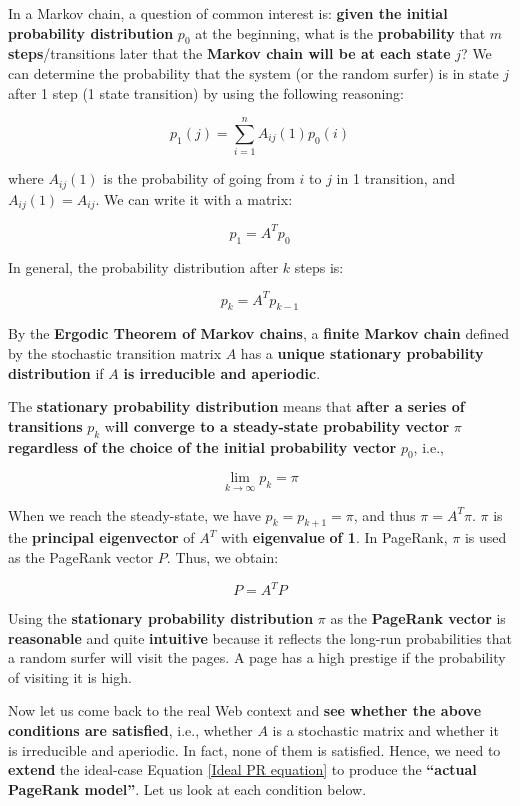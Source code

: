 In a Markov chain, a question of common interest is: \textbf{given the initial probability distribution} $p_0$ at the beginning, what is the \textbf{probability} that $m$ \textbf{steps}/transitions later that the \textbf{Markov chain will be at each state} $j$? We can determine the probability that the system (or the random surfer) is in state $j$ after 1 step (1 state transition) by using the following reasoning:

$$
p_1(j) = \sum_{i = 1}^n A_{ij}(1) p_0(i)
$$

where $A_{ij}(1)$ is the probability of going from $i$ to $j$ in 1 transition, and $A_{ij}(1) = A_{ij}$. We can write it with a matrix:

$$
p_1 = A^T p_0
$$

In general, the probability distribution after $k$ steps is:

\begin{equation}
    p_k = A^T p_{k-1}
\end{equation}

By the \textbf{Ergodic Theorem of Markov chains}, a \textbf{finite Markov chain} defined by the stochastic transition matrix $A$ has a \textbf{unique stationary probability distribution} if $A$ \textbf{is irreducible and aperiodic}. 

The \textbf{stationary probability distribution} means that \textbf{after a series of transitions} $p_k$ w\textbf{ill converge to a steady-state probability vector} $\pi$ \textbf{regardless of the choice of the initial probability vector} $p_0$, i.e.,

$$
\lim_{k \to \infty} p_k = \pi
$$

When we reach the steady-state, we have $p_k = p_{k+1} = \pi$, and thus $\pi = A^T \pi$. $\pi$ is the \textbf{principal eigenvector} of $A^T$ with \textbf{eigenvalue} \textbf{of 1}. In PageRank, $\pi$ is used as the PageRank vector $P$. Thus, we obtain:

\begin{equation}\label{Ideal PR equation}
    P = A^T P
\end{equation}

Using the \textbf{stationary probability distribution} $\pi$ as the \textbf{PageRank vector} is \textbf{reasonable} and quite \textbf{intuitive} because it reflects the long-run probabilities that a random surfer will visit the pages. A page has a high prestige if the probability of visiting it is high.

Now let us come back to the real Web context and \textbf{see whether the above conditions are satisfied}, i.e., whether $A$ is a stochastic matrix and whether it is irreducible and aperiodic. In fact, none of them is satisfied. Hence, we need to \textbf{extend} the ideal-case Equation \ref{Ideal PR equation} to produce the \textbf{“actual PageRank model”}. Let us look at each condition below. 

